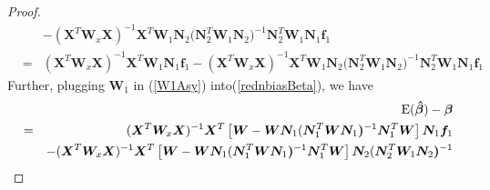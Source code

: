 \documentclass[article,lineno]{biometrika}
\begin{document}
\begin{proof}
\begin{eqnarray}
&& 
-
(\boldsymbol X^T  \boldsymbol W_x \boldsymbol X )^{-1} \boldsymbol X^T
\boldsymbol W_1 \boldsymbol N_2 
(\boldsymbol N_2^T  \boldsymbol W_1 \boldsymbol N_2 \boldsymbol )^{-1} 
\boldsymbol N_2^T  \boldsymbol W_1 
\boldsymbol N_{1} \boldsymbol f_1 \nonumber\\
&=&  \label{rednbiasBeta}
(\boldsymbol X^T  \boldsymbol W_x \boldsymbol X )^{-1} \boldsymbol X^T 
\boldsymbol W_1 \boldsymbol N_{1} \boldsymbol f_1 
-
(\boldsymbol X^T  \boldsymbol W_x \boldsymbol X )^{-1} \boldsymbol X^T 
\boldsymbol W_1 \boldsymbol N_2 
(\boldsymbol N_2^T  \boldsymbol W_1 \boldsymbol N_2 \boldsymbol )^{-1} 
\boldsymbol N_2^T \boldsymbol W_1
\boldsymbol N_{1} \boldsymbol f_1 
\end{eqnarray}
Further, plugging  $\bm W_1$ in (\ref{W1Asy}) into(\ref{rednbiasBeta}), we have 
\begin{eqnarray*}
&& 
{\rm E}(\boldsymbol {\hat \beta})  -  \boldsymbol \beta  \nonumber \\
&=& 
(\boldsymbol X^T  \boldsymbol W_x \boldsymbol X )^{-1} \boldsymbol X^T 
\left[\boldsymbol W 
-
\boldsymbol W \boldsymbol N_1 
(\boldsymbol N_1^T  \boldsymbol W \boldsymbol N_1 \boldsymbol)^{-1} 
\boldsymbol N_1^T  \boldsymbol W \right] \boldsymbol N_{1} \boldsymbol f_1 \\
&&
-
(\boldsymbol X^T  \boldsymbol W_x \boldsymbol X )^{-1} \boldsymbol X^T 
\left[\boldsymbol W 
-
\boldsymbol W \boldsymbol N_1 
(\boldsymbol N_1^T  \boldsymbol W \boldsymbol N_1 \boldsymbol)^{-1} 
\boldsymbol N_1^T  \boldsymbol W \right] \boldsymbol N_2 
(\boldsymbol N_2^T  \boldsymbol W_1 \boldsymbol N_2 \boldsymbol )^{-1} 

\end{eqnarray*}
\end{proof}
\end{document}
